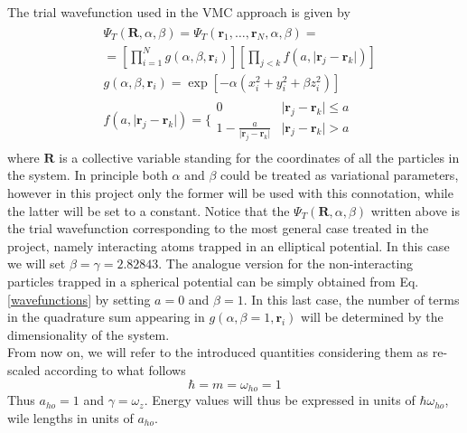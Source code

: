 The trial wavefunction used in the VMC approach is given by
\begin{align}
\begin{split}
    &\Psi_T(\bm{R},\alpha, \beta) = \Psi_T(\bm{r}_1, \dots, \bm{r}_N, \alpha, \beta) = \\
    &= \left[ \prod_{i=1}^N g(\alpha, \beta, \bm{r}_i) \right]  \left[ \prod_{j<k} f(a, \vert \bm{r}_j - \bm{r}_k \vert ) \right] \\
    &g(\alpha, \beta, \bm{r}_i) = \exp \left[ -\alpha \left( x_i^2 + y_i^2 + \beta z_i^2 \right) \right] \\
    &f(a, \vert \bm{r}_j - \bm{r}_k \vert ) = \Bigg\{ \begin{array}{ll}
        0 & \vert \bm{r}_j - \bm{r}_k \vert \leq a \\
        1 - \frac{a}{\vert \bm{r}_j - \bm{r}_k \vert} & \vert \bm{r}_j - \bm{r}_k \vert > a
    \end{array}
\end{split}
\label{wavefunctions}
\end{align}
where $\bm{R}$ is a collective variable standing for the coordinates of all the particles in the system. In principle both $\alpha$ and $\beta$ could be treated as variational parameters, however in this project only the former will be used with this connotation, while the latter will be set to a constant. Notice that the $\Psi_T(\bm{R},\alpha,\beta)$ written above is the trial wavefunction corresponding to the most general case treated in the project, namely interacting atoms trapped in an elliptical potential. In this case we will set $\beta = \gamma = 2.82843$. The analogue version for the non-interacting particles trapped in a spherical potential can be simply obtained from Eq.\,\ref{wavefunctions} by setting $a=0$ and $\beta=1$. In this last case, the number of terms in the quadrature sum appearing in $g(\alpha, \beta=1, \bm{r}_i)$ will be determined by the dimensionality of the system. \\

From now on, we will refer to the introduced quantities considering them as re-scaled according to what follows
\begin{equation*}
    \hbar = m = \omega_{ho} = 1
\end{equation*}
Thus $a_{ho}=1$ and $\gamma = \omega_z$. Energy values will thus be expressed in units of $\hbar \omega_{ho}$, wile lengths in units of $a_{ho}$.

